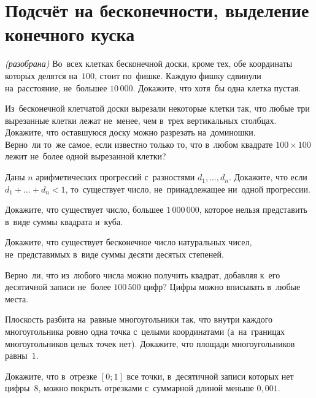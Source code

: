 
\section*{Подсчёт на бесконечности, выделение конечного куска}


\begin{problems}

\emph{(разобрана)}
Во~всех клетках бесконечной доски, кроме тех, обе координаты которых делятся
на~$100$, стоит по~фишке.
Каждую фишку сдвинули на~расстояние, не~большее $10\,000$.
Докажите, что хотя~бы одна клетка пустая.

\item
\sp
Из~бесконечной клетчатой доски вырезали некоторые клетки так, что любые три
вырезанные клетки лежат не~менее, чем в~трех вертикальных столбцах.
Докажите, что оставшуюся доску можно разрезать на~доминошки.
\\
\sp
Верно~ли то~же самое, если известно только то, что в~любом квадрате
$100 \times 100$ лежит не~более одной вырезанной клетки?

\item
Даны $n$ арифметических прогрессий с~разностями $d_1, \ldots, d_n$.
Докажите, что если $d_1 + \ldots + d_n < 1$, то~существует число,
не~принадлежащее ни~одной прогрессии.

\item
Докажите, что существует число, большее $1\,000\,000$, которое нельзя
представить в~виде суммы квадрата и~куба.

\item
Докажите, что существует бесконечное число натуральных чисел, не~представимых
в~виде суммы десяти десятых степеней.

\item
Верно~ли, что из~любого числа можно получить квадрат, добавляя к~его десятичной
записи не~более $100\,500$ цифр?
Цифры можно вписывать в~любые места.

\item
Плоскость разбита на~равные многоугольники так, что внутри каждого
многоугольника ровно одна точка с~целыми координатами (а~на~границах
многоугольников целых точек нет).
Докажите, что площади многоугольников равны~$1$.

\item
Докажите, что в~отрезке $[0; 1]$ все точки, в~десятичной записи которых нет
цифры~$8$, можно покрыть отрезками с~суммарной длиной меньше $0{,}001$.

\end{problems}

